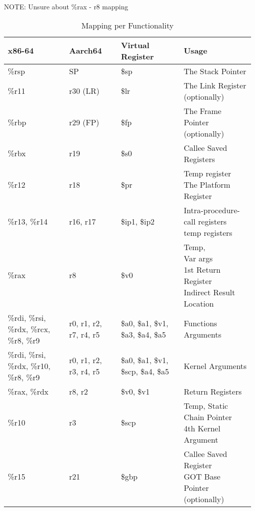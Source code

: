 \documentclass[11pt]{article}
\begin{document}
NOTE: Unsure about \%rax - r8 mapping

\begin{table}[ht]
\caption{Mapping per Functionality}
\begin{adjustwidth}{-4.3cm}{-4.3cm}
\begin{tabular}{|l|l|l|l|}
    \hline
    \textbf{x86-64} & \textbf{Aarch64} & \textbf{Virtual Register} & \textbf{Usage} \\
    \hline
    \%rsp & SP & \$sp & The Stack Pointer \\
    \hline
    \%r11 & r30 (LR) & \$lr & The Link Register (optionally) \\
    \hline
    \%rbp & r29 (FP) & \$fp & The Frame Pointer (optionally) \\
    \hline
    \%rbx & r19 & \$s0 & Callee Saved Registers \\
    \hline
    \%r12 & r18 & \$pr & \pbox{20cm}{Temp register \\ The Platform Register} \\
    \hline
    \%r13, \%r14 & r16, r17 & \$ip1, \$ip2 & \pbox{20cm}{Intra-procedure-call registers \\ temp registers} \\
    \hline
    \%rax & r8 & \$v0 & \pbox{20cm}{Temp, \\  Var args \\ 1st Return Register \\ Indirect Result Location} \\
    \hline
    \%rdi, \%rsi, \%rdx, \%rcx, \%r8, \%r9 & r0, r1, r2, r7, r4, r5 & \$a0, \$a1, \$v1, \$a3, \$a4, \$a5 & Functions Arguments \\
    \hline
    \%rdi, \%rsi, \%rdx, \%r10, \%r8, \%r9 & r0, r1, r2, r3, r4, r5 & \$a0, \$a1, \$v1, \$scp, \$a4, \$a5 & Kernel Arguments \\
    \hline
    \%rax, \%rdx & r8, r2 & \$v0, \$v1 & Return Registers \\
    \hline
    \%r10 & r3 & \$scp & \pbox{20cm}{Temp, Static Chain Pointer \\ 4th Kernel Argument} \\
    \hline
    \%r15 & r21 & \$gbp & \pbox{20cm}{Callee Saved Register \\ GOT Base Pointer (optionally)} \\
    \hline
\end{tabular}
\end{adjustwidth}\label{tab:mappings_per_func}
\end{table}
\end{document}
